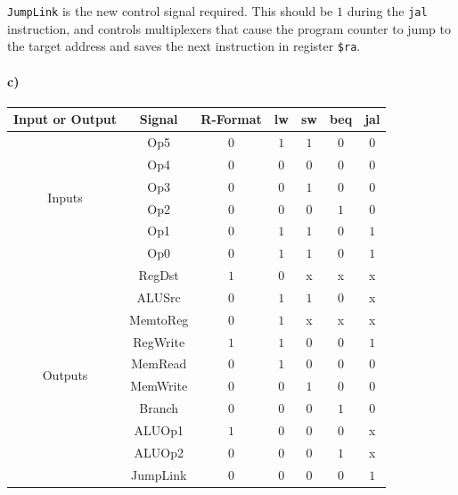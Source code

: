 \documentclass[12pt]{article}
\begin{document}
\texttt{JumpLink} is the new control signal required. This should be \(1\) during the \texttt{jal} instruction, and controls multiplexers that
cause the program counter to jump to the target address and saves the next instruction in register \texttt{\$ra}.

\paragraph{c)}

\begin{center}
        \begin{tabular}{c|c|c|c|c|c|c}
                Input or Output & Signal & R-Format & lw & sw & beq & jal\\
                \hline
                \multirow{6}{*}{Inputs} & Op5 & \(0\) & \(1\) & \(1\) & \(0\) & \(0\)\\
                & Op4 & \(0\) & \(0\) & \(0\) & \(0\) & \(0\)\\
                & Op3 & \(0\) & \(0\) & \(1\) & \(0\) & \(0\)\\
                & Op2 & \(0\) & \(0\) & \(0\) & \(1\) & \(0\)\\
                & Op1 & \(0\) & \(1\) & \(1\) & \(0\) & \(1\)\\
                & Op0 & \(0\) & \(1\) & \(1\) & \(0\) & \(1\)\\
                \hline
                \multirow{10}{*}{Outputs} & RegDst & \(1\) & \(0\) & x & x & x\\
                & ALUSrc & \(0\) & \(1\) & \(1\) & \(0\) & x\\
                & MemtoReg & \(0\) & \(1\) & x & x & x\\
                & RegWrite & \(1\) & \(1\) & \(0\) & \(0\) & \(1\)\\
                & MemRead & \(0\) & \(1\) & \(0\) & \(0\) & \(0\)\\
                & MemWrite & \(0\) & \(0\) & \(1\) & \(0\) & \(0\)\\
                & Branch & \(0\) & \(0\) & \(0\) & \(1\) & \(0\)\\
                & ALUOp1 & \(1\) & \(0\) & \(0\) & \(0\) & x\\
                & ALUOp2 & \(0\) & \(0\) & \(0\) & \(1\) & x\\
                & JumpLink & \(0\) & \(0\) & \(0\) & \(0\) & \(1\)
        \end{tabular}
\end{center}
\end{document}
